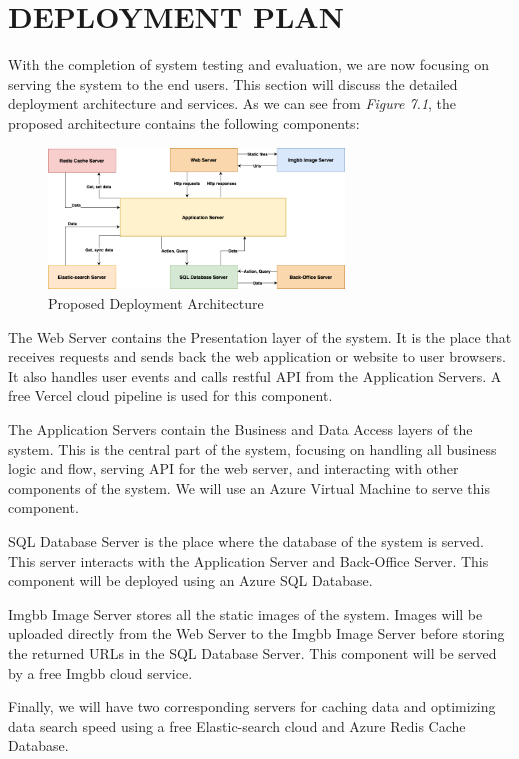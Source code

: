 \chapter{DEPLOYMENT PLAN} 
With the completion of system testing and evaluation, we are now 
focusing on serving the system to the end users. This section will 
discuss the detailed deployment architecture and services. As we 
can see from \textit{Figure 7.1}, the proposed architecture contains the 
following components:
\begin{figure}[H]
    \centering
    \includegraphics[width=0.7\textwidth]{Figures/Deployment/Pattern and Architecture-Deployment.drawio.png}
    \caption{Proposed Deployment Architecture}
    \label{fig:deployment-architecture}
\end{figure}
The Web Server contains the Presentation layer of the system. It is the place that receives requests and sends 
back the web application or website to user browsers. It also 
handles user events and calls restful API from the Application 
Servers. A free Vercel cloud pipeline is used for this component.

The Application Servers contain the Business and Data Access layers 
of the system. This is the central part of the system, focusing on 
handling all business logic and flow, serving API for the web server, 
and interacting with other components of the system. We will use an Azure 
Virtual Machine to serve this component.

SQL Database Server is the place where the database of the system is served. 
This server interacts with the Application Server and Back-Office Server. 
This component will be deployed using an Azure SQL Database.

Imgbb Image Server stores all the static images of the system. Images will 
be uploaded directly from the Web Server to the Imgbb Image Server before 
storing the returned URLs in the SQL Database Server. This component will 
be served by a free Imgbb cloud service.

Finally, we will have two corresponding servers for caching data and optimizing 
data search speed using a free Elastic-search cloud and Azure Redis Cache Database.